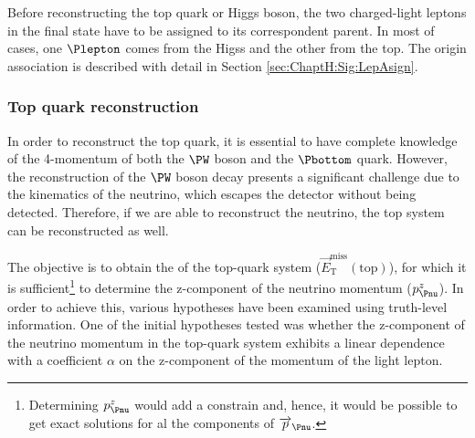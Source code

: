 Before reconstructing the top quark or Higgs boson, the two charged-light leptons in the final state have to be
assigned to its correspondent parent. In most of cases, one $\Plepton$ comes from the Higss and the other 
from the top. The origin association is described with detail in Section \ref{sec:ChaptH:Sig:LepAsign}.

\subsubsection{Top quark reconstruction}
In order to reconstruct the top quark, it is essential to have complete knowledge of the 4-momentum of both 
the $\PW$ boson and the $\Pbottom$ quark. However, the reconstruction of the $\PW$ boson decay presents a 
significant challenge due to the kinematics of the neutrino, which escapes the detector without being detected.
Therefore, if we are able to reconstruct the neutrino, the top system can be reconstructed as well. 

The objective is to obtain the \MET of the top-quark system ($\overrightarrow{E}_{\text{T}}^{\text{miss}} (\text{top})$), 
for which it is sufficient\footnote{Determining $p^{z}_{\Pnu}$ would add a constrain and, hence, it would be 
possible to get exact solutions for al the components of $\overrightarrow{p}_{\Pnu}$.}
 to determine the z-component of the neutrino momentum ($p^{z}_{\Pnu}$). 
In order to achieve this, various hypotheses have been examined using truth-level information. 
One of the initial hypotheses tested was whether the z-component of the neutrino momentum in the top-quark system 
exhibits a linear dependence with a coefficient $\alpha$ on the z-component of the momentum of the light lepton. 

